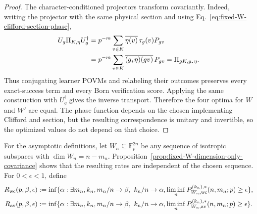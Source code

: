 \documentclass[11pt]{article}
\newcommand{\F}{\mathbb F}
\newcommand{\1}{\mathbf 1}
\theoremstyle{plain}
\theoremstyle{definition}
\theoremstyle{remark}
\begin{document}
\begin{proof}
The character-conditioned projectors transform covariantly.  Indeed, writing
the projector with the same physical section and using
Eq.~\eqref{eq:fixed-W-clifford-section-phase},
\begin{align}
 U_g\Pi_{K,\eta}U_g^\dagger
 &=p^{-m}\sum_{v\in K}\overline{\eta(v)}\,
   \tau_g(v)P_{gv}\notag\\
 &=p^{-m}\sum_{v\in K}\overline{(g_*\eta)(gv)}\,P_{gv}
 =\Pi_{gK,g_*\eta}.
 \label{eq:fixed-W-report-projector-covariance}
\end{align}
Thus conjugating learner POVMs and relabeling their outcomes preserves every
exact-success term and every Born verification score.  Applying the same
construction with $U_g^\dagger$ gives the inverse transport.  Therefore the
four optima for $W$ and $W'$ are equal.  The phase function depends on the
chosen implementing Clifford and section, but the resulting correspondence is
unitary and invertible, so the optimized values do not depend on that choice.
\end{proof}

For the asymptotic definitions, let $W_n\subseteq\F_p^{2n}$ be any sequence of
isotropic subspaces with $\dim W_n=n-m_n$.  Proposition~\ref{prop:fixed-W-dimension-only-covariance}
shows that the resulting rates are independent of the chosen sequence.  For
$0<\epsilon<1$, define
\begin{align}
 R_{\mathrm{wc}}(p,\beta,\epsilon)
 &:={\inf}\{\alpha:\exists m_n,k_n,
 m_n/n\to\beta,\ k_n/n\to\alpha,
 \liminf_nP_{W_n,\rm wc}^{(k_n),*}(n,m_n;p)\ge\epsilon\},
 \label{eq:fixed-W-wc-rate}\\
 R_{\mathrm{av}}(p,\beta,\epsilon)
 &:={\inf}\{\alpha:\exists m_n,k_n,
 m_n/n\to\beta,\ k_n/n\to\alpha,
 \liminf_nP_{W_n,\rm av}^{(k_n),*}(n,m_n;p)\ge\epsilon\}.
 \label{eq:fixed-W-av-rate}
\end{align}
\end{document}
